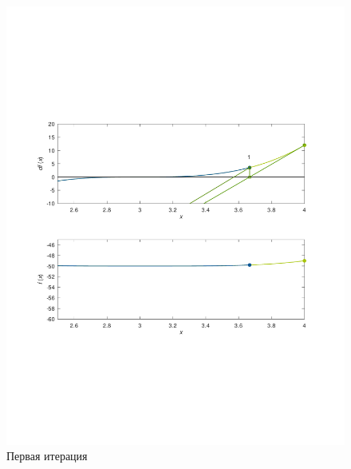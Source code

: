 \documentclass[a4paper,12pt]{article}
\begin{document}
    \begin{figure}[H]
        \centering
        \includegraphics[scale=0.4]{1secantitter.pdf}
        \caption{Первая итерация}
    \end{figure}
\end{document}
